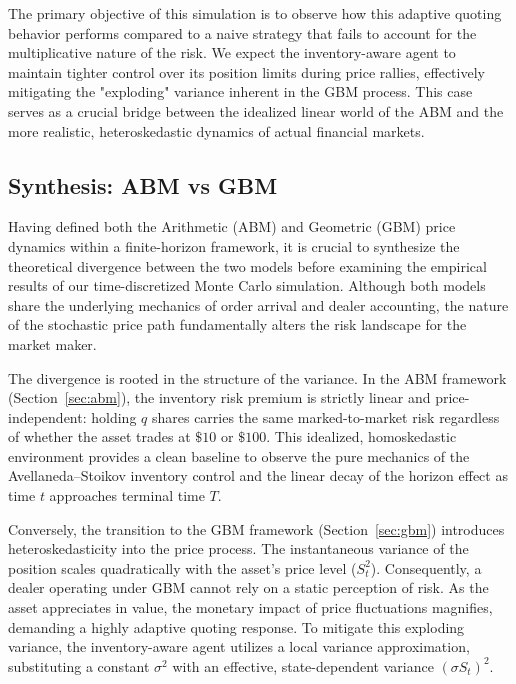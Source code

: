 The primary objective of this simulation is to observe how this adaptive quoting behavior performs compared to a naive strategy that fails to account for the multiplicative nature of the risk. We expect the inventory-aware agent to maintain tighter control over its position limits during price rallies, effectively mitigating the "exploding" variance inherent in the GBM process. This case serves as a crucial bridge between the idealized linear world of the ABM and the more realistic, heteroskedastic dynamics of actual financial markets.

\subsection{Synthesis: ABM vs GBM}

Having defined both the Arithmetic (ABM) and Geometric (GBM) price dynamics within a finite-horizon framework, it is crucial to synthesize the theoretical divergence between the two models before examining the empirical results of our time-discretized Monte Carlo simulation. Although both models share the underlying mechanics of order arrival and dealer accounting, the nature of the stochastic price path fundamentally alters the risk landscape for the market maker.

The divergence is rooted in the structure of the variance. In the ABM framework (Section~\ref{sec:abm}), the inventory risk premium is strictly linear and price-independent: holding $q$ shares carries the same marked-to-market risk regardless of whether the asset trades at $\$10$ or $\$100$. This idealized, homoskedastic environment provides a clean baseline to observe the pure mechanics of the Avellaneda--Stoikov inventory control and the linear decay of the horizon effect as time $t$ approaches terminal time $T$.

Conversely, the transition to the GBM framework (Section~\ref{sec:gbm}) introduces heteroskedasticity into the price process. The instantaneous variance of the position scales quadratically with the asset's price level ($S_t^2$). Consequently, a dealer operating under GBM cannot rely on a static perception of risk. As the asset appreciates in value, the monetary impact of price fluctuations magnifies, demanding a highly adaptive quoting response. To mitigate this exploding variance, the inventory-aware agent utilizes a local variance approximation, substituting a constant $\sigma^2$ with an effective, state-dependent variance $(\sigma S_t)^2$.

